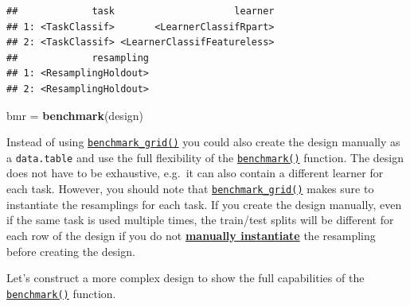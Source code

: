\documentclass[]{article}
\newenvironment{Shaded}{\begin{snugshade}}{\end{snugshade}}
\newcommand{\KeywordTok}[1]{\textcolor[rgb]{0.13,0.29,0.53}{\textbf{#1}}}
\newcommand{\NormalTok}[1]{#1}
\newcommand{\StringTok}[1]{\textcolor[rgb]{0.31,0.60,0.02}{#1}}
\renewenvironment{Shaded} {\begin{snugshade}\small} {\end{snugshade}}
\begin{document}
\begin{verbatim}
##             task                     learner
## 1: <TaskClassif>       <LearnerClassifRpart>
## 2: <TaskClassif> <LearnerClassifFeatureless>
##             resampling
## 1: <ResamplingHoldout>
## 2: <ResamplingHoldout>
\end{verbatim}

\begin{Shaded}
\begin{Highlighting}[]
\NormalTok{bmr =}\StringTok{ }\KeywordTok{benchmark}\NormalTok{(design)}
\end{Highlighting}
\end{Shaded}

Instead of using \href{https://mlr3.mlr-org.com/reference/benchmark_grid.html}{\texttt{benchmark\_grid()}} you could also create the design manually as a \texttt{data.table} and use the full flexibility of the \href{https://mlr3.mlr-org.com/reference/benchmark.html}{\texttt{benchmark()}} function.
The design does not have to be exhaustive, e.g.~it can also contain a different learner for each task.
However, you should note that \href{https://mlr3.mlr-org.com/reference/benchmark_grid.html}{\texttt{benchmark\_grid()}} makes sure to instantiate the resamplings for each task.
If you create the design manually, even if the same task is used multiple times, the train/test splits will be different for each row of the design if you do not \protect\hyperlink{resampling-inst}{\textbf{manually instantiate}} the resampling before creating the design.

Let's construct a more complex design to show the full capabilities of the \href{https://mlr3.mlr-org.com/reference/benchmark.html}{\texttt{benchmark()}} function.
\end{document}
